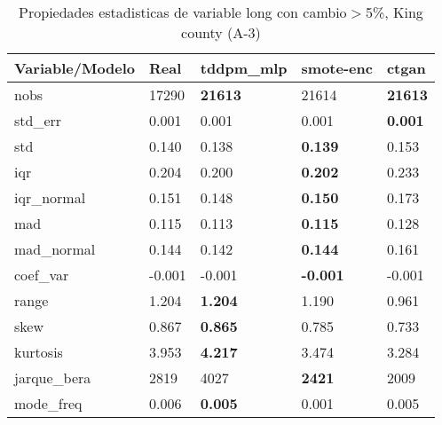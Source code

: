 \begin{table}[H]
\centering
\fontsize{8}{14}\selectfont
\caption{Propiedades estadisticas de variable long con cambio\ensuremath{>}5\%, King county (A-3)}
\label{table-stats-king county-a-3-long-short}
\begin{tabular}{|l|m{10em}|m{10em}|m{10em}|m{10em}|}
\hline
 \rowcolor[gray]{0.8}
Variable/Modelo & Real & tddpm\_mlp & smote-enc & ctgan \\
\hline nobs & 17290 & \bfseries 21613 & \cellcolor[rgb]{0.9, 0.54, 0.52} 21614 & \bfseries 21613 \\
\hline std\_err & 0.001 & \cellcolor[rgb]{0.9, 0.54, 0.52} 0.001 & 0.001 & \bfseries 0.001 \\
\hline std & 0.140 & 0.138 & \bfseries 0.139 & \cellcolor[rgb]{0.9, 0.54, 0.52} 0.153 \\
\hline iqr & 0.204 & 0.200 & \bfseries 0.202 & \cellcolor[rgb]{0.9, 0.54, 0.52} 0.233 \\
\hline iqr\_normal & 0.151 & 0.148 & \bfseries 0.150 & \cellcolor[rgb]{0.9, 0.54, 0.52} 0.173 \\
\hline mad & 0.115 & 0.113 & \bfseries 0.115 & \cellcolor[rgb]{0.9, 0.54, 0.52} 0.128 \\
\hline mad\_normal & 0.144 & 0.142 & \bfseries 0.144 & \cellcolor[rgb]{0.9, 0.54, 0.52} 0.161 \\
\hline coef\_var & -0.001 & -0.001 & \bfseries -0.001 & \cellcolor[rgb]{0.9, 0.54, 0.52} -0.001 \\
\hline range & 1.204 & \bfseries 1.204 & 1.190 & \cellcolor[rgb]{0.9, 0.54, 0.52} 0.961 \\
\hline skew & 0.867 & \bfseries 0.865 & 0.785 & \cellcolor[rgb]{0.9, 0.54, 0.52} 0.733 \\
\hline kurtosis & 3.953 & \bfseries 4.217 & 3.474 & \cellcolor[rgb]{0.9, 0.54, 0.52} 3.284 \\
\hline jarque\_bera & 2819 & \cellcolor[rgb]{0.9, 0.54, 0.52} 4027 & \bfseries 2421 & 2009 \\
\hline mode\_freq & 0.006 & \bfseries 0.005 & \cellcolor[rgb]{0.9, 0.54, 0.52} 0.001 & 0.005 \\
\hline
\end{tabular}
\end{table}
